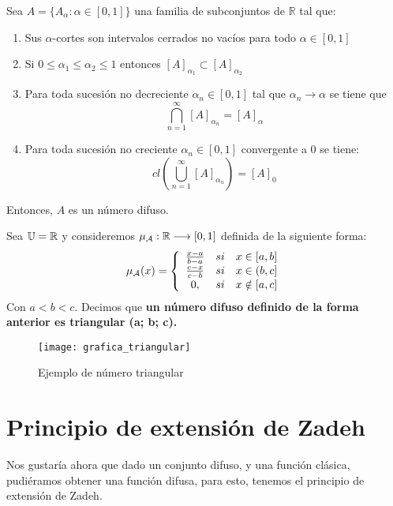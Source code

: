 \begin{teorema}
	Sea $A=\{A_\alpha : \alpha \in [0, 1]\}$ una familia de subconjuntos de $\mathbb{R}$ tal que:
	
	\begin{enumerate}
		\item Sus $\alpha$-cortes son intervalos cerrados no vacíos para todo $\alpha \in [0, 1]$
		\item Si $0 \leq \alpha_1 \leq \alpha_2 \leq 1$ entonces $[A]_{\alpha_1} \subset [A]_{\alpha_2}$
		\item Para toda sucesión no decreciente $\alpha_n \in [0, 1]$ tal que $\alpha_n \longrightarrow \alpha$ se tiene que
		$$
		\bigcap^\infty_{n=1} [A]_{\alpha_n}=[A]_\alpha
		$$
		\item Para toda sucesión no creciente $\alpha_n \in [0, 1]$ convergente a $0$ se tiene:
		$$
		cl\left(\bigcup^\infty_{n=1} [A]_{\alpha_n}\right)=[A]_0
		$$
	\end{enumerate}
	Entonces, $A$ es un número difuso.
\end{teorema}


\begin{ejemplo}
	Sea $\mathbb U=\mathbb R$ y consideremos $\mu_\mathcal{A}: \mathbb R \longrightarrow [0, 1]$ definida de la siguiente forma:
	$$
	\mu_\mathcal{A}(x)=\left\{
	\begin{array}{c c c}
	\frac{x-a}{b-a} & si & x \in [a, b] \\
	\frac{c-x}{c-b} & si & x \in (b, c] \\
	0, & si & x \notin [a, c]
	\end{array}
	\right.
	$$
	Con $a < b < c$. Decimos que \textbf{un número difuso definido de la forma anterior es triangular (a; b; c).} 
	
	\begin{figure}[h]
		\centering
		\texttt{[image: grafica\_triangular]}
		\caption{Ejemplo de número triangular}
		\label{fig:numero_difuso}
	\end{figure}
	
\end{ejemplo}


\section{Principio de extensión de Zadeh}
Nos gustaría ahora que dado un conjunto difuso, y una función clásica, pudiéramos obtener una función difusa, para esto, tenemos el principio de extensión de Zadeh.

